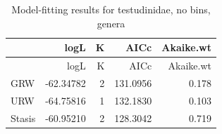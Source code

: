 \documentclass[]{article}
\begin{document}
\begin{longtable}[]{@{}lrrrr@{}}
\caption{Model-fitting results for testudinidae, no bins,
genera}\tabularnewline
\toprule
& logL & K & AICc & Akaike.wt\tabularnewline
\midrule
\endfirsthead
\toprule
& logL & K & AICc & Akaike.wt\tabularnewline
\midrule
\endhead
GRW & -62.34782 & 2 & 131.0956 & 0.178\tabularnewline
URW & -64.75816 & 1 & 132.1830 & 0.103\tabularnewline
Stasis & -60.95210 & 2 & 128.3042 & 0.719\tabularnewline
\bottomrule
\end{longtable}
\end{document}
